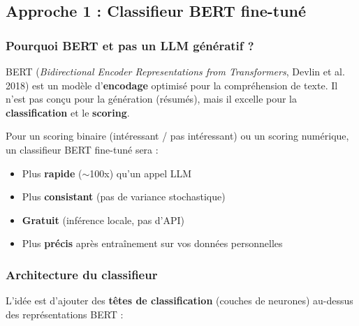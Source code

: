 \documentclass[11pt, a4paper]{article}
\begin{document}
\subsection{Approche 1 : Classifieur BERT fine-tuné}

\subsubsection{Pourquoi BERT et pas un LLM génératif ?}

BERT (\textit{Bidirectional Encoder Representations from Transformers}, Devlin et al. 2018) est un modèle d'\textbf{encodage} optimisé pour la compréhension de texte. Il n'est pas conçu pour la génération (résumés), mais il excelle pour la \textbf{classification} et le \textbf{scoring}.

\begin{infobox}
Pour un scoring binaire (intéressant / pas intéressant) ou un scoring numérique, un classifieur BERT fine-tuné sera :
\begin{itemize}
    \item Plus \textbf{rapide} ($\sim$100x) qu'un appel LLM
    \item Plus \textbf{consistant} (pas de variance stochastique)
    \item \textbf{Gratuit} (inférence locale, pas d'API)
    \item Plus \textbf{précis} après entraînement sur vos données personnelles
\end{itemize}
\end{infobox}

\subsubsection{Architecture du classifieur}

L'idée est d'ajouter des \textbf{têtes de classification} (couches de neurones) au-dessus des représentations BERT :
\end{document}
